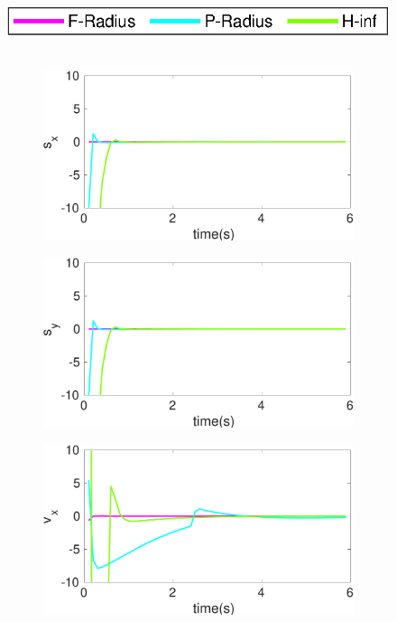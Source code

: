 \begin{figure}[!h]
\hspace*{\fill} \includegraphics[scale=0.8]{figures/ratelegend}\\\\
\begin{subfigure}{.5\linewidth}
\centering
\includegraphics[width=\linewidth]{figures/BoundChange/CA/ca_bound_changes_x}
\end{subfigure}
\begin{subfigure}{.5\linewidth}
\centering
\includegraphics[width=\linewidth]{figures/BoundChange/CA/ca_bound_changes_y}
\end{subfigure}
\begin{subfigure}{.5\linewidth}
\centering
\includegraphics[width=\linewidth]{figures/BoundChange/CA/ca_bound_changev_x}

\end{subfigure}
\end{figure}
